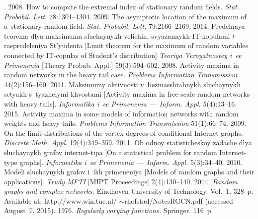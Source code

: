 \begin{multicols}{2}
{{\begin{thebibliography}{99}
. 2008. How to compute the extremal
index of stationary random fields.
\textit{Stat. Probabil. Lett.} 78:1301--1304.
 2009. The asymptotic location of the maximum of
a~stationary random field.
\textit{Stat. Probabil. Lett.} 79:2166--2169.
 2014. Predelnaya teorema dlya maksimuma sluchaynykh velichin,
svyazannykh IT-kopulami \mbox{$t$-ras}\-pre\-de\-leniya St'yudenta [Limit theorem for the maximum
of random variables connected by IT-copulas of Student's distribution]
\textit{Teoriya Veroyatnostey i~ee Primenenia} [Theory Probab. Appl.]
59(3):594--602.
 2008. Activity maxima in random networks
 in the heavy tail case. \textit{Problems Information Transmission}
 44(2):156--160.
 2011. Maksimumy aktivnosti v~bezmasshtabnykh sluchaynykh
setyakh s~tyazhelymi khvostami
[Activity maxima in free-scale random networks with heavy tails].
\textit{Informatika i~ee Primenenia}~--- \textit{Inform. Appl.} 5(4):13--16.
 2015. Activity maxima in some models of information
networks with random weights and heavy tails. \textit{Problems
Information Transmission} 51(1):66--74.
 2009. On the limit distributions of the vertex degrees
of conditional Internet graphs. \textit{Discrete Math. Appl.}
19(4):349--359.
 2011. Ob odnoy statisticheskoy zadache dlya
sluchaynykh grafov internet-tipa
[On a statistical problem for random Internet-type graphs].
\textit{Informatika i~ee Primenenia}~--- \textit{Inform. Appl.}  5(3):34--40.
 2010. Modeli sluchaynykh grafov i~ikh
primeneniya [Models of random graphs
and their applications]. \textit{Trudy MFTI} [MIPT Proceedings] 2(4):130--140.
 2014. \textit{Random graphs and complex networks.} 
Eindhoven University of Technology. Vol.~1. 328~p. Available at:
{\sf  http://www.win.tue.nl/ $\sim$\/rhofstad/NotesRGCN.pdf}
(accessed August~7, 2015).
 1976. \textit{Regularly varying functions.} Springer. 116~p.

\end{thebibliography}}}
\end{multicols}
